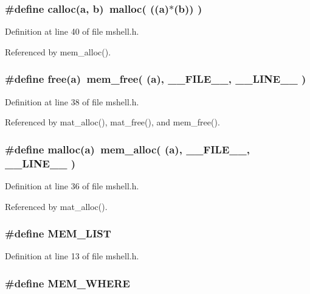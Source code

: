 \subsubsection{\setlength{\rightskip}{0pt plus 5cm}\#define calloc(a, b)\ malloc( ((a)$\ast$(b)) )}\label{mshell_8h_a6}




Definition at line 40 of file mshell.h.

Referenced by mem\_\-alloc().
\subsubsection{\setlength{\rightskip}{0pt plus 5cm}\#define free(a)\ mem\_\-free( (a), \_\-\_\-FILE\_\-\_\-, \_\-\_\-LINE\_\-\_\- )}\label{mshell_8h_a4}




Definition at line 38 of file mshell.h.

Referenced by mat\_\-alloc(), mat\_\-free(), and mem\_\-free().
\subsubsection{\setlength{\rightskip}{0pt plus 5cm}\#define malloc(a)\ mem\_\-alloc( (a), \_\-\_\-FILE\_\-\_\-, \_\-\_\-LINE\_\-\_\- )}\label{mshell_8h_a2}




Definition at line 36 of file mshell.h.

Referenced by mat\_\-alloc().
\subsubsection{\setlength{\rightskip}{0pt plus 5cm}\#define MEM\_\-LIST}\label{mshell_8h_a0}




Definition at line 13 of file mshell.h.
\subsubsection{\setlength{\rightskip}{0pt plus 5cm}\#define MEM\_\-WHERE}\label{mshell_8h_a1}




